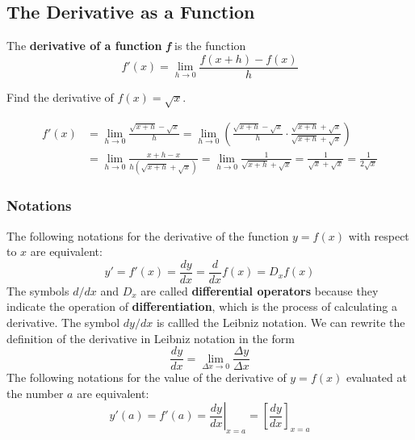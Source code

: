 \subsection{The Derivative as a Function}

\begin{definition}
    The \textbf{derivative of a function \textit{f}} is the function
    \[f'(x)=\lim_{h\to 0}\frac{f(x+h)-f(x)}{h}\]
\end{definition}
\begin{problem}
    Find the derivative of \(f(x)=\sqrt{x}\).
\end{problem}
\begin{solution}
    \begin{align*}
        f'(x) &= \lim_{h\to 0}\frac{\sqrt{x+h}-\sqrt{x}}{h}=\lim_{h\to 0}
        \left(\frac{\sqrt{x+h}-\sqrt{x}}{h}\cdot
        \frac{\sqrt{x+h}+\sqrt{x}}{\sqrt{x+h}+\sqrt{x}}\right) \\
        &= \lim_{h\to 0}\frac{x+h-x}{h(\sqrt{x+h}+\sqrt{x})}
        =\lim_{h\to 0}\frac{1}{\sqrt{x+h}+\sqrt{x}}
        =\frac{1}{\sqrt{x}+\sqrt{x}}=\frac{1}{2\sqrt{x}} 
    \end{align*}
\end{solution}

\subsubsection*{Notations}
The following notations for the derivative of the function \(y=f(x)\) with
respect to \(x\) are equivalent:
\[y'=f'(x)=\frac{dy}{dx}=\frac{d}{dx}f(x)=D_x f(x)\]
The symbols \(d/dx\) and \(D_x\) are called \textbf{differential operators}
because they indicate the operation of \textbf{differentiation},
which is the process of calculating a derivative.
The symbol \(dy/dx\) is callled the Leibniz notation.
We can rewrite the definition of the derivative in Leibniz notation in the
form
\[\frac{dy}{dx}=\lim_{\Delta x\to0}\frac{\Delta y}{\Delta x}\]
The following notations for the value of the derivative of \(y=f(x)\)
evaluated at the number \(a\) are equivalent:
\[y'(a)=f'(a)=\left.\frac{dy}{dx}\right|_{x=a}
=\left[\frac{dy}{dx}\right]_{x=a}\]


